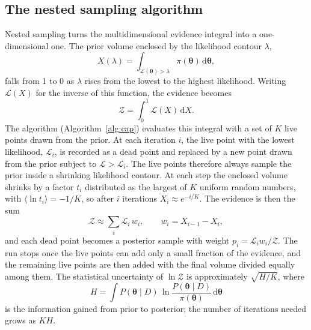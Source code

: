 \subsection{The nested sampling algorithm}
Nested sampling turns the multidimensional evidence integral into a one-dimensional one. The prior volume enclosed by the likelihood contour $\lambda$,
\begin{equation}
X(\lambda) = \int_{\mathcal{L}(\boldsymbol{\theta})>\lambda} \pi(\boldsymbol{\theta})\,\mathrm{d}\boldsymbol{\theta},
\end{equation}
falls from 1 to 0 as $\lambda$ rises from the lowest to the highest likelihood. Writing $\mathcal{L}(X)$ for the inverse of this function, the evidence becomes
\begin{equation}
\mathcal{Z} = \int_0^1 \mathcal{L}(X)\,\mathrm{d}X.
\end{equation}
The algorithm (Algorithm~\ref{alg:cap}) evaluates this integral with a set of $K$ live points drawn from the prior. At each iteration $i$, the live point with the lowest likelihood, $\mathcal{L}_i$, is recorded as a dead point and replaced by a new point drawn from the prior subject to $\mathcal{L}>\mathcal{L}_i$. The live points therefore always sample the prior inside a shrinking likelihood contour. At each step the enclosed volume shrinks by a factor $t_i$ distributed as the largest of $K$ uniform random numbers, with $\langle\ln t_i\rangle=-1/K$, so after $i$ iterations $X_i\approx e^{-i/K}$. The evidence is then the sum
\begin{equation}
\mathcal{Z} \approx \sum_i \mathcal{L}_i\,w_i,\qquad w_i = X_{i-1}-X_i,
\end{equation}
and each dead point becomes a posterior sample with weight $p_i=\mathcal{L}_i w_i/\mathcal{Z}$. The run stops once the live points can add only a small fraction of the evidence, and the remaining live points are then added with the final volume divided equally among them. The statistical uncertainty of $\ln\mathcal{Z}$ is approximately $\sqrt{H/K}$, where
\begin{equation}
H = \int P(\boldsymbol{\theta}\mid D)\,\ln\frac{P(\boldsymbol{\theta}\mid D)}{\pi(\boldsymbol{\theta})}\,\mathrm{d}\boldsymbol{\theta}
\end{equation}
is the information gained from prior to posterior; the number of iterations needed grows as $KH$.

